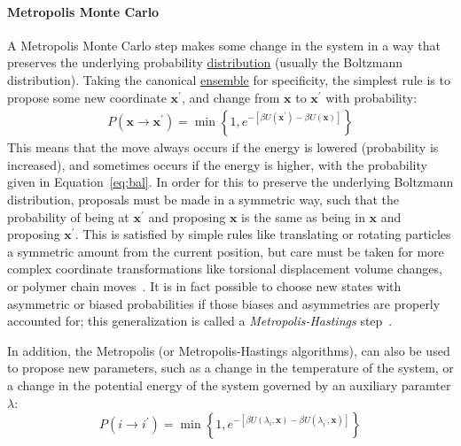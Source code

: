 \documentclass[9pt,review]{livecoms}
\newcommand{\vx}{\mathbf{x}}
\begin{document}
\hypertarget{ref:MetropolisMonteCarlo} {\paragraph{Metropolis Monte Carlo}}
A Metropolis Monte Carlo step makes some change in the system in a way that preserves the underlying probability \hyperlink{ref:Distribution} {distribution} (usually the Boltzmann distribution).  Taking the canonical \hyperlink{ref:Ensemble} {ensemble} for specificity, the simplest rule is to propose some new coordinate $\vx^\prime$, and change from $\vx$ to $\vx^\prime$ with probability:
\begin{eqnarray}
P(\vx\rightarrow \vx^\prime) = \min\left\{1, e^{-\left[\beta U(\vx^\prime)-\beta U(\vx)\right]}\right\}
\label{eq:bal}
\end{eqnarray}
This means that the move always occurs if the energy is lowered (probability is increased), and sometimes occurs if the energy is higher, with the probability given in Equation~\ref{eq:bal}.
In order for this to preserve the underlying Boltzmann distribution, proposals must be made in a symmetric way, such that the probability of being at $\vx^\prime$ and proposing $\vx$ is the same as being in $\vx$ and proposing $\vx^\prime$. This is satisfied by simple rules like translating or rotating particles a symmetric amount from the current position, but care must be taken for more complex coordinate transformations like torsional displacement volume changes, or polymer chain moves~\cite{Siepmann_mp_1992}.  It is in fact possible to choose new states with asymmetric or biased probabilities if those biases and asymmetries are properly accounted for; this generalization is called a \emph{Metropolis-Hastings} step~\cite{Hastings_biometrika_1970}.

In addition, the Metropolis (or Metropolis-Hastings algorithms), can also be used to propose new parameters, such as a change in the temperature of the system, or a change in the potential energy of the system governed by an auxiliary paramter $\lambda$:
\begin{equation}
    P(i\rightarrow i^{\prime}) = \min\left\{1,e^{-\left[\beta U(\lambda_i,\vx)-\beta U(\lambda_{i^{\prime}},\vx)\right]}\right\}
\end{equation}
\end{document}

